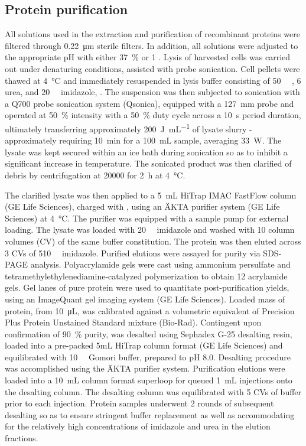 \begin{refsection}
\subsection{Protein purification}

All solutions used in the extraction and purification of recombinant proteins
were filtered through \SI{0.22}{\um} sterile filters. In addition, all solutions
were adjusted to the appropriate pH with either \SI{37}{\percent}  or
\SI{1}{\moLar} . Lysis of harvested cells was carried out under
denaturing conditions, assisted with probe sonication. Cell pellets were thawed
at \SI{4}{\celsius} and immediately resuspended in lysis buffer consisting of
\SI{50}{\milli\moLar} , \SI{6}{\moLar} urea, and
\SI{20}{\milli\moLar} imidazole, . The suspension was then subjected to
sonication with a Q700 probe sonication system (Qsonica), equipped with a
\SI{127}{\mm} probe and operated at \SI{50}{\percent} intensity with a
\SI{50}{\percent} duty cycle across a \SI{10}{\second} period duration,
ultimately transferring approximately \SI{200}{\joule\per\mL} of lysate slurry -
approximately requiring \SI{10}{\minute} for a \SI{100}{\mL} sample, averaging
\SI{33}{\watt}. The lysate was kept secured within an ice bath during sonication
so as to inhibit a significant increase in temperature. The sonicated product
was then clarified of debris by centrifugation at \SI{20000}{\gforce} for
\SI{2}{\hour} at \SI{4}{\celsius}.

The clarified lysate was then applied to a \SI{5}{\mL} HiTrap IMAC FastFlow
column (GE Life Sciences), charged with , using an \"{A}KTA purifier
system (GE Life Sciences) at \SI{4}{\celsius}. The purifier was equipped with a
sample pump for external loading. The lysate was loaded with
\SI{20}{\milli\moLar} imidazole and washed with 10 column volumes (CV) of the
same buffer constitution. The protein was then eluted across 3 CVs of
\SI{510}{\milli\moLar} imidazole. Purified elutions were assayed for purity via
SDS-PAGE analysis. Polyacrylamide gels were cast using ammonium persulfate and
tetramethylethylenediamine-catalyzed polymerization to obtain \SI{12}{\wtper}
acrylamide gels. Gel lanes of pure protein were used to quantitate
post-purification yields, using an ImageQuant gel imaging system (GE Life
Sciences). Loaded mass of protein, from \SI{10}{\uL}, was calibrated against a
volumetric equivalent of Precision Plus Protein Unstained Standard mixture
(Bio-Rad). Contingent upon confirmation of \SI{90}{\percent} purity, was
desalted using Sephadex G-25 desalting resin, loaded into a pre-packed 5mL
HiTrap column format (GE Life Sciences) and equilibrated with
\SI{10}{\milli\moLar} Gomori buffer, prepared to pH 8.0. Desalting procedure was
accomplished using the \"{A}KTA purifier system. Purification elutions were
loaded into a \SI{10}{\mL} column format superloop for queued \SI{1}{\mL}
injections onto the desalting column. The desalting column was equilibrated with
5 CVs of buffer prior to each injection. Protein samples underwent 2 rounds of
subsequent desalting so as to ensure stringent buffer replacement as well as
accommodating for the relatively high concentrations of imidazole and urea in
the elution fractions.


\end{refsection}
